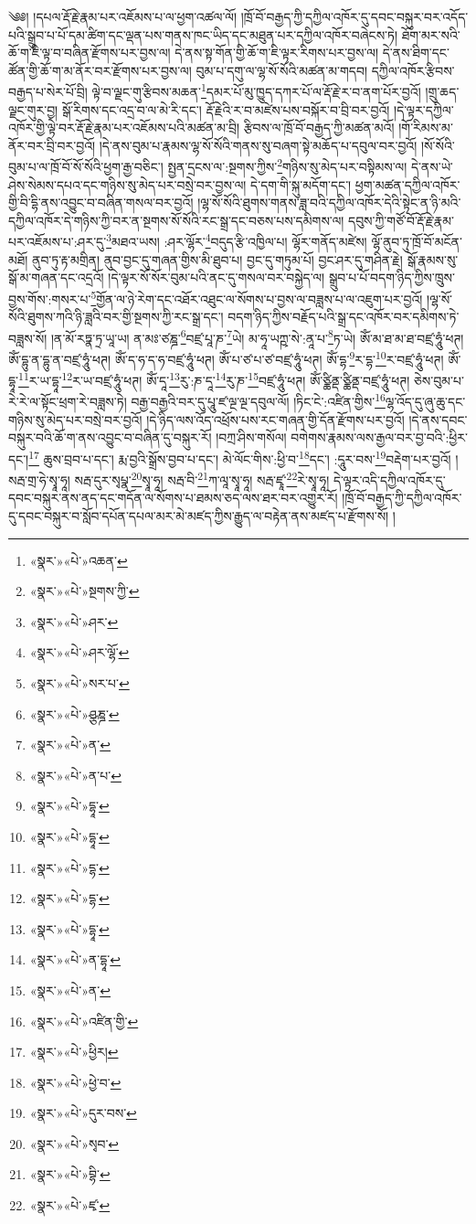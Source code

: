 ༄༅། །དཔལ་རྡོ་རྗེ་རྣམ་པར་འཇོམས་པ་ལ་ཕྱག་འཚལ་ལོ། །ཁྲོ་བོ་བརྒྱད་ཀྱི་དཀྱིལ་འཁོར་དུ་དབང་བསྐུར་བར་འདོད་པའི་སྒྲུབ་པ་པོ་དམ་ཚིག་དང་ལྡན་པས་གནས་ཁང་ཡིད་དང་མཐུན་པར་དཀྱིལ་འཁོར་བཞེངས་ཏེ། ཐོག་མར་སའི་ཆོ་ག་ཇི་ལྟ་བ་བཞིན་རྫོགས་པར་བྱས་ལ། དེ་ནས་སྟ་གོན་གྱི་ཆོ་ག་ཇི་ལྟར་རིགས་པར་བྱས་ལ། དེ་ནས་ཐིག་དང་ཚོན་གྱི་ཆོ་ག་མ་ནོར་བར་རྫོགས་པར་བྱས་ལ། བུམ་པ་དགུ་ལ་ལྷ་སོ་སོའི་མཚན་མ་གདབ། དཀྱིལ་འཁོར་རྩིབས་བརྒྱད་པ་སེར་པོ་བྲི། ལྟེ་བ་ལྗང་གུ་རྩིབས་མཆན་\footnote{«སྣར་»«པེ་»འཆན་}དམར་པོ་མུ་ཁྱུད་དཀར་པོ་ལ་རྡོ་རྗེ་ར་བ་ནག་པོར་བྱའོ། །གྲུ་ཆད་ལྗང་གུར་བྱ། སྒོ་རིགས་དང་འདྲ་བ་ལ་མེ་རི་དང་། རྡོ་རྗེའི་ར་བ་མཛེས་པས་བསྐོར་བ་བྲི་བར་བྱའོ། །དེ་ལྟར་དཀྱིལ་འཁོར་གྱི་ལྟེ་བར་རྡོ་རྗེ་རྣམ་པར་འཇོམས་པའི་མཚན་མ་བྲི། རྩིབས་ལ་ཁྲོ་བོ་བརྒྱད་ཀྱི་མཚན་མའོ། །གོ་རིམས་མ་ནོར་བར་བྲི་བར་བྱའོ། །དེ་ནས་བུམ་པ་རྣམས་ལྷ་སོ་སོའི་གནས་སུ་བཞག་སྟེ་མཆོད་པ་དབུལ་བར་བྱའོ། །སོ་སོའི་བུམ་པ་ལ་ཁྲོ་བོ་སོ་སོའི་ཕྱག་རྒྱ་བཅིང་། སྤྱན་དྲངས་ལ་:སྔགས་ཀྱིས་\footnote{«སྣར་»«པེ་»སྔགས་ཀྱི་}གཉིས་སུ་མེད་པར་བསྟིམས་ལ། དེ་ནས་ཡེ་ཤེས་སེམས་དཔའ་དང་གཉིས་སུ་མེད་པར་བསྲེ་བར་བྱས་ལ། དེ་དག་གི་སྐུ་མདོག་དང་། ཕྱག་མཚན་དཀྱིལ་འཁོར་གྱི་བི་དྷི་ནས་འབྱུང་བ་བཞིན་གསལ་བར་བྱའོ། །ལྷ་སོ་སོའི་ཐུགས་གནས་ཟླ་བའི་དཀྱིལ་འཁོར་དེའི་སྟེང་ན་ཉི་མའི་དཀྱིལ་འཁོར་དེ་གཉིས་ཀྱི་བར་ན་སྔགས་སོ་སོའི་རང་སྒྲ་དང་བཅས་པས་དམིགས་ལ། དབུས་ཀྱི་གཙོ་བོ་རྡོ་རྗེ་རྣམ་པར་འཇོམས་པ་:ཤར་དུ་\footnote{«སྣར་»«པེ་»ཤར་}མཐའ་ཡས། :ཤར་ལྷོར་\footnote{«སྣར་»«པེ་»ཤར་ལྷོ་}བདུད་རྩི་འཁྱིལ་པ། ལྷོར་གནོད་མཛེས། ལྷོ་ནུབ་ཏུ་ཁྲོ་བོ་མངོན་མཐོ། ནུབ་ཏུ་རྟ་མགྲིན། ནུབ་བྱང་དུ་གཞན་གྱིས་མི་ཐུབ་པ། བྱང་དུ་གཏུམ་པོ། བྱང་ཤར་དུ་གཤིན་རྗེ། སྒོ་རྣམས་སུ་སྒོ་མ་གཞན་དང་འདྲའོ། །དེ་ལྟར་སོ་སོར་བུམ་པའི་ནང་དུ་གསལ་བར་བསྐྱེད་ལ། སྒྲུབ་པ་པོ་བདག་ཉིད་ཀྱིས་ཁྲུས་བྱས་གོས་:གསར་པ་\footnote{«སྣར་»«པེ་»སར་པ་}གྱོན་ལ་ཉེ་རེག་དང་འཐོར་འཐུང་ལ་སོགས་པ་བྱས་ལ་བཟླས་པ་ལ་འཇུག་པར་བྱའོ། །ལྷ་སོ་སོའི་ཐུགས་ཀའི་ཉི་ཟླའི་བར་གྱི་སྔགས་ཀྱི་རང་སྒྲ་དང་། བདག་ཉིད་ཀྱིས་བརྗོད་པའི་སྒྲ་དང་འཁོར་བར་དམིགས་ཏེ་བཟླས་སོ། །ན་མོ་རཏྣ་ཏྲ་ཡཱ་ཡ། ན་མཿ་ཙཎྜ་\footnote{«སྣར་»«པེ་»ཤྩཎྜ་}བཛྲ་པཱ་ཎ་\footnote{«སྣར་»«པེ་»ན་}ཡེ། མ་ཧཱ་ཡཀྵ་སེ་:ནཱ་པ་\footnote{«སྣར་»«པེ་»ན་པ་}ཏ་ཡེ། ཨོཾ་མ་ཐ་མ་ཐ་བཛྲ་ཧཱུཾ་ཕཊ། ཨོཾ་དྷུ་ན་དྷུ་ན་བཛྲ་ཧཱུཾ་ཕཊ། ཨོཾ་ད་ཧ་ད་ཧ་བཛྲ་ཧཱུཾ་ཕཊ། ཨོཾ་པ་ཙ་པ་ཙ་བཛྲ་ཧཱུཾ་ཕཊ། ཨོཾ་དྷ་\footnote{«སྣར་»«པེ་»དྷཱ་}ར་དྷ་\footnote{«སྣར་»«པེ་»དྷཱ་}ར་བཛྲ་ཧཱུཾ་ཕཊ། ཨོཾ་དྷཱ་\footnote{«སྣར་»«པེ་»དྷ་}ར་ཡ་དྷཱ་\footnote{«སྣར་»«པེ་»དྷ་}ར་ཡ་བཛྲ་ཧཱུཾ་ཕཊ། ཨོཾ་དཱ་\footnote{«སྣར་»«པེ་»དྷཱ་}རུ་:ཎ་དཱ་\footnote{«སྣར་»«པེ་»ན་དྷཱ་}རུ་ཎ་\footnote{«སྣར་»«པེ་»ན་}བཛྲ་ཧཱུཾ་ཕཊ། ཨོཾ་ཙྪིནྡ་ཙྪིནྡ་བཛྲ་ཧཱུཾ་ཕཊ། ཅེས་བུམ་པ་རེ་རེ་ལ་སྟོང་ཕྲག་རེ་བཟླས་ཏེ། བརྒྱ་བརྒྱའི་བར་དུ་པཱུ་ཛ་ལྔ་ལྔ་དབུལ་ལོ། །ཏིང་ངེ་:འཛིན་གྱིས་\footnote{«སྣར་»«པེ་»འཛིན་གྱི་}ལྷ་འོད་དུ་ཞུ་ཆུ་དང་གཉིས་སུ་མེད་པར་བསྲེ་བར་བྱའོ། །དེ་ཉིད་ལས་འོད་འཕྲོས་པས་རང་གཞན་གྱི་དོན་རྫོགས་པར་བྱའོ། །དེ་ནས་དབང་བསྐུར་བའི་ཆོ་ག་ནས་འབྱུང་བ་བཞིན་དུ་བསྐུར་རོ། །བཀྲ་ཤིས་གསོལ། བགེགས་རྣམས་ལས་རྒྱལ་བར་བྱ་བའི་:ཕྱིར་དང་།\footnote{«སྣར་»«པེ་»ཕྱིར།} ཆུས་བྲབ་པ་དང་། རྨ་བྱའི་སྒྲོས་བྱབ་པ་དང་། མེ་ལོང་གིས་:ཕྱི་བ་\footnote{«སྣར་»«པེ་»ཕྱེ་བ་}དང་། :དཱུར་བས་\footnote{«སྣར་»«པེ་»དུར་བས་}བརྡེག་པར་བྱའོ། །སརྦ་གྲ་ཧེ་སྭཱ་ཧཱ། སརྦ་དུར་སྭཔྣ་\footnote{«སྣར་»«པེ་»སྭབ་}སྭཱ་ཧཱ། སརྦ་བི་\footnote{«སྣར་»«པེ་»བྷི་}ཀ་ལཱ་སྭཱ་ཧཱ། སརྦ་ཛྭཱ་\footnote{«སྣར་»«པེ་»ཛྭ་}རེ་སྭཱ་ཧཱ། དེ་ལྟར་འདི་དཀྱིལ་འཁོར་དུ་དབང་བསྐུར་ནས་ནད་དང་གདོན་ལ་སོགས་པ་ཐམས་ཅད་ལས་ཐར་བར་འགྱུར་རོ། །ཁྲོ་བོ་བརྒྱད་ཀྱི་དཀྱིལ་འཁོར་དུ་དབང་བསྐུར་བ་སློབ་དཔོན་དཔལ་མར་མེ་མཛད་ཀྱིས་རྒྱུད་ལ་བརྟེན་ནས་མཛད་པ་རྫོགས་སོ། ། 
